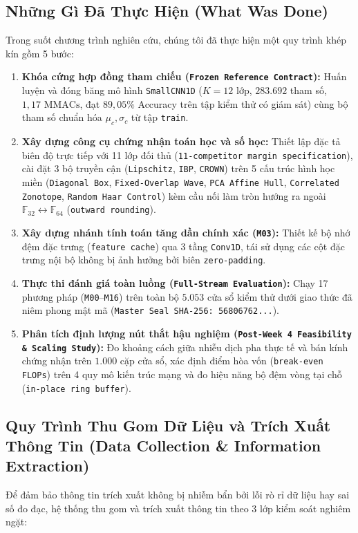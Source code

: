 \documentclass[11pt,a4paper]{article}
\newcommand{\F}{\mathbb{F}}
\newcommand{\code}[1]{{\small\ttfamily\nolinkurl{#1}}}
\begin{document}
\subsection{Những Gì Đã Thực Hiện (What Was Done)}
Trong suốt chương trình nghiên cứu, chúng tôi đã thực hiện một quy trình khép kín gồm 5 bước:
\begin{enumerate}
  \item \textbf{Khóa cứng hợp đồng tham chiếu (\code{Frozen Reference Contract}):} Huấn luyện và đóng băng mô hình \code{SmallCNN1D} ($K=12$ lớp, $283.692$ tham số, $1,17\text{ MMACs}$, đạt $89,05\%$ Accuracy trên tập kiểm thử có giám sát) cùng bộ tham số chuẩn hóa $\mu_c, \sigma_c$ từ tập \code{train}.
  \item \textbf{Xây dựng công cụ chứng nhận toán học và số học:} Thiết lập đặc tả biên độ trực tiếp với 11 lớp đối thủ (\code{11-competitor margin specification}), cài đặt 3 bộ truyền cận (\code{Lipschitz}, \code{IBP}, \code{CROWN}) trên 5 cấu trúc hình học miền (\code{Diagonal Box}, \code{Fixed-Overlap Wave}, \code{PCA Affine Hull}, \code{Correlated Zonotope}, \code{Random Haar Control}) kèm cầu nối làm tròn hướng ra ngoài $\F_{32} \leftrightarrow \F_{64}$ (\code{outward rounding}).
  \item \textbf{Xây dựng nhánh tính toán tăng dần chính xác (\code{M03}):} Thiết kế bộ nhớ đệm đặc trưng (\code{feature cache}) qua 3 tầng \code{Conv1D}, tái sử dụng các cột đặc trưng nội bộ không bị ảnh hưởng bởi biên \code{zero-padding}.
  \item \textbf{Thực thi đánh giá toàn luồng (\code{Full-Stream Evaluation}):} Chạy 17 phương pháp (\code{M00}--\code{M16}) trên toàn bộ $5.053$ cửa sổ kiểm thử dưới giao thức đã niêm phong mật mã (\code{Master Seal SHA-256: 56806762...}).
  \item \textbf{Phân tích định lượng nút thắt hậu nghiệm (\code{Post-Week 4 Feasibility \& Scaling Study}):} Đo khoảng cách giữa nhiễu dịch pha thực tế và bán kính chứng nhận trên $1.000$ cặp cửa sổ, xác định điểm hòa vốn (\code{break-even FLOPs}) trên 4 quy mô kiến trúc mạng và đo hiệu năng bộ đệm vòng tại chỗ (\code{in-place ring buffer}).
\end{enumerate}

\subsection{Quy Trình Thu Gom Dữ Liệu và Trích Xuất Thông Tin (Data Collection \& Information Extraction)}
Để đảm bảo thông tin trích xuất không bị nhiễm bẩn bởi lỗi rò rỉ dữ liệu hay sai số đo đạc, hệ thống thu gom và trích xuất thông tin theo 3 lớp kiểm soát nghiêm ngặt:
\end{document}
